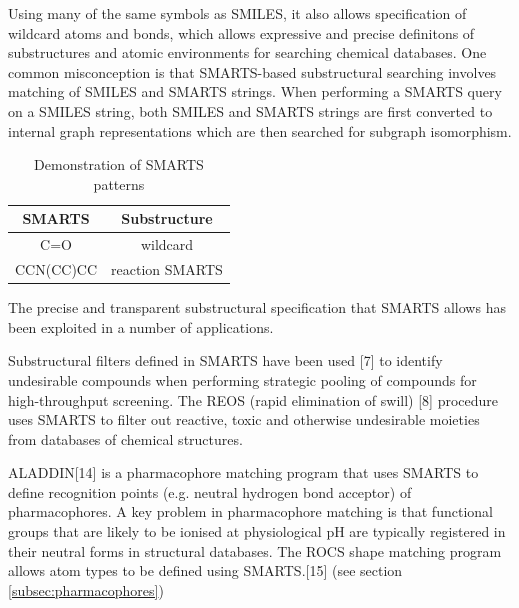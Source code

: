 Using many of the same symbols as SMILES, it also allows specification of wildcard atoms and bonds, which allows expressive and precise definitons of substructures and atomic environments for searching chemical databases. One common misconception is that SMARTS-based substructural searching involves matching of SMILES and SMARTS strings. When performing a SMARTS query on a SMILES string, both SMILES and SMARTS strings are first converted to internal graph representations which are then searched for subgraph isomorphism.

\begin{table}[!h]
\begin{center}
    \begin{tabular}{|c|c|}
    \hline
        SMARTS & Substructure \\
        \hline
        C=O & wildcard \\
        CCN(CC)CC & reaction SMARTS \\
        \hline
    \end{tabular}
    \caption{Demonstration of SMARTS patterns}
    \label{table:smarts}
\end{center}
\end{table}

The precise and transparent substructural specification that SMARTS allows has been exploited in a number of applications.

Substructural filters defined in SMARTS have been used [7] to identify undesirable compounds when performing strategic pooling of compounds for high-throughput screening. The REOS (rapid elimination of swill) [8] procedure uses SMARTS to filter out reactive, toxic and otherwise undesirable moieties from databases of chemical structures.

ALADDIN[14] is a pharmacophore matching program that uses SMARTS to define recognition points (e.g. neutral hydrogen bond acceptor) of pharmacophores. A key problem in pharmacophore matching is that functional groups that are likely to be ionised at physiological pH are typically registered in their neutral forms in structural databases. The ROCS shape matching program allows atom types to be defined using SMARTS.[15] (see section \ref{subsec:pharmacophores})


